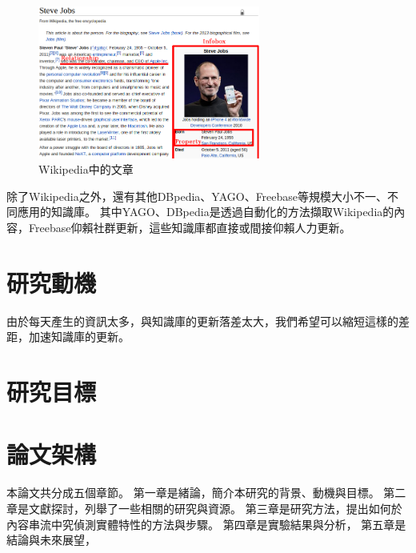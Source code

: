 \begin{figure}
\centering
\includegraphics[width=0.65\textwidth]{images/01-wiki-as-kb}
\caption{Wikipedia中的文章}
\label{i:wiki}
\end{figure}

除了Wikipedia之外，還有其他DBpedia\cite{dbpedia-swj}、YAGO\cite{suchanek2007WWW}、Freebase\cite{freebase}等規模大小不一、不同應用的知識庫。
其中YAGO、DBpedia是透過自動化的方法擷取Wikipedia的內容，Freebase仰賴社群更新，這些知識庫都直接或間接仰賴人力更新。

%
%
\section{研究動機}

由於每天產生的資訊太多，與知識庫的更新落差太大，我們希望可以縮短這樣的差距，加速知識庫的更新。



%
%
\section{研究目標}

%
%
\section{論文架構}  %
本論文共分成五個章節。
第一章是緒論，簡介本研究的背景、動機與目標。
第二章是文獻探討，列舉了一些相關的研究與資源。
第三章是研究方法，提出如何於內容串流中究偵測實體特性的方法與步驟。
第四章是實驗結果與分析，
第五章是結論與未來展望，

